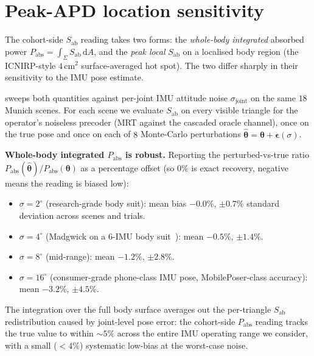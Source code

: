 \documentclass[10pt,journal,twocolumn]{IEEEtran}
\theoremstyle{plain}
\theoremstyle{definition}
\begin{document}
\section{Peak-APD location sensitivity}\label{si:peak-apd}

The cohort-side $S_\mathrm{ab}$ reading takes two forms: the
\emph{whole-body integrated} absorbed power $P_\mathrm{abs}
= \int_\Sigma S_\mathrm{ab}\,\mathrm{d}A$, and the \emph{peak local}
$S_\mathrm{ab}$ on a localised body region (the ICNIRP-style
$4\,$cm$^2$ surface-averaged hot spot). The two differ sharply in
their sensitivity to the IMU pose estimate.

 sweeps both quantities against per-joint
IMU attitude noise $\sigma_\mathrm{joint}$ on the same $18$
Munich scenes. For each scene we evaluate $S_\mathrm{ab}$ on
every visible triangle for the operator's noiseless precoder
(MRT against the cascaded oracle channel), once on the true
pose and once on each of $8$ Monte-Carlo perturbations
$\hat{\bm{\theta}} = \bm{\theta} + \bm{\epsilon}(\sigma)$.

\textbf{Whole-body integrated $P_\mathrm{abs}$ is robust.}
Reporting the perturbed-vs-true ratio
$P_\mathrm{abs}(\hat{\bm{\theta}}) / P_\mathrm{abs}(\bm{\theta})$
as a percentage offset (so $0\%$ is exact recovery, negative
means the reading is biased low):
\begin{itemize}
  \item $\sigma = 2^{\circ}$ (research-grade body suit): mean
    bias $-0.0\%$, $\pm 0.7\%$ standard deviation across
    scenes and trials.
  \item $\sigma = 4^{\circ}$ (Madgwick on a 6-IMU body
    suit~\cite{Madgwick2011}): mean $-0.5\%$, $\pm 1.4\%$.
  \item $\sigma = 8^{\circ}$ (mid-range): mean $-1.2\%$,
    $\pm 2.8\%$.
  \item $\sigma = 16^{\circ}$ (consumer-grade phone-class IMU
    pose, MobilePoser-class accuracy): mean $-3.2\%$,
    $\pm 4.5\%$.
\end{itemize}
The integration over the full body surface averages out the
per-triangle $S_\mathrm{ab}$ redistribution caused by
joint-level pose error: the cohort-side $P_\mathrm{abs}$
reading tracks the true value to within ${\sim}5\%$ across
the entire IMU operating range we consider, with a small
($<4\%$) systematic low-bias at the worst-case noise.
\end{document}
